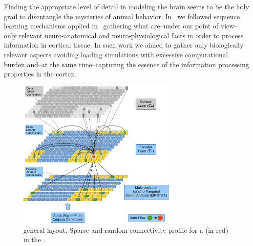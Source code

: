 \documentclass[10pt,journal,compsoc]{IEEEtran}
\begin{document}
Finding the appropriate level of detail in modeling the brain seems to be the holy grail to disentangle the mysteries of animal behavior. In~\cite{Dematties2018} we followed sequence learning mechanisms applied in~\cite{10.3389/fncir.2016.00023} gathering what are--under our point of view--only relevant neuro-anatomical and neuro-physiological facts in order to process information in cortical tissue. In such work we aimed to gather only biologically relevant aspects avoiding loading simulations with excessive computational burden and--at the same time--capturing the essence of the information processing properties in the cortex.

\begin{figure}[ht]
    \centering
    \includegraphics[width=0.7\textwidth]{EncoderColumnConnections.png}
    \caption{ general layout. Sparse and random connectivity profile for a  (in red) in the .}
    \label{fig:EncoderColumnConnections}
\end{figure}
\end{document}
